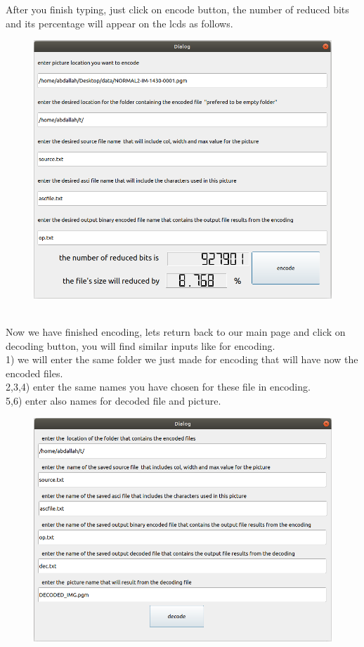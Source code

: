 \documentclass[11 pt,twocolumn,letterpaper]{article}
\begin{document}
After you finish typing, just click on encode button, the number of reduced bits and its percentage will appear on the lcds as follows.\\
\begin{figure}[ht]
\includegraphics[width=0.8\linewidth]{figure 5}
\end{figure} \\
Now we have finished encoding, lets return back to our main page and click on decoding button, you will find similar inputs like for encoding.\\
1) we will enter the same folder we just made for encoding that will have now the encoded files.\\
2,3,4) enter the same  names you have chosen for these file in encoding.\\
5,6) enter also names for decoded file and picture.\\
\begin{figure}[ht]
\includegraphics[width=0.8\linewidth]{figure 6}
\end{figure}\\
\end{document}
